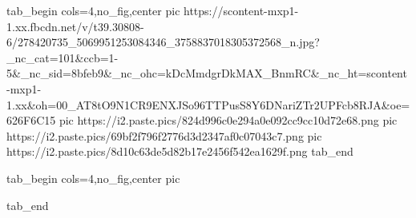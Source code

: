  
 
 
 
 

\ifcmt
  tab_begin cols=4,no_fig,center
     pic https://scontent-mxp1-1.xx.fbcdn.net/v/t39.30808-6/278420735_5069951253084346_3758837018305372568_n.jpg?_nc_cat=101&ccb=1-5&_nc_sid=8bfeb9&_nc_ohc=kDcMmdgrDkMAX_BnmRC&_nc_ht=scontent-mxp1-1.xx&oh=00_AT8tO9N1CR9ENXJSo96TTPusS8Y6DNariZTr2UPFcb8RJA&oe=626F6C15
     pic https://i2.paste.pics/824d996c0e294a0e092cc9cc10d72e68.png
     pic https://i2.paste.pics/69bf2f796f2776d3d2347af0c07043c7.png
     pic https://i2.paste.pics/8d10c63de5d82b17e2456f542ea1629f.png
  tab_end
\fi

\ifcmt
  tab_begin cols=4,no_fig,center
     pic 

  tab_end
\fi
